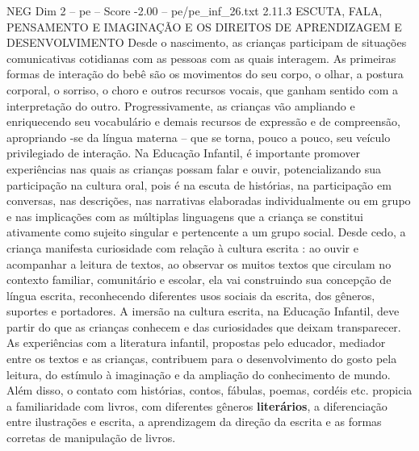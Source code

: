 \begin{textsample}{NEG Dim 2 – pe – Score -2.00 – pe/pe\_inf\_26.txt}  \label{ex:f2_neg_032}
2.11.3 ESCUTA, FALA, PENSAMENTO E IMAGINAÇÃO E OS DIREITOS DE APRENDIZAGEM E DESENVOLVIMENTO Desde o nascimento, as crianças participam de situações comunicativas cotidianas com as pessoas com as quais interagem.
As primeiras formas de interação do bebê são os movimentos do seu corpo, o olhar, a postura corporal, o sorriso, o choro e outros recursos vocais, que ganham sentido com a interpretação do outro.
Progressivamente, as crianças vão ampliando e enriquecendo seu vocabulário e demais recursos de expressão e de compreensão, apropriando -se da língua materna – que se torna, pouco a pouco, seu veículo privilegiado de interação.
Na Educação Infantil, é importante promover experiências nas quais as crianças possam falar e ouvir, potencializando sua participação na cultura oral, pois é na escuta de histórias, na participação em conversas, nas descrições, nas narrativas elaboradas individualmente ou em grupo e nas implicações com as múltiplas linguagens que a criança se constitui ativamente como sujeito singular e pertencente a um grupo social.
Desde cedo, a criança manifesta curiosidade com relação à cultura escrita : ao ouvir e acompanhar a leitura de textos, ao observar os muitos textos que circulam no contexto familiar, comunitário e escolar, ela vai construindo sua concepção de língua escrita, reconhecendo diferentes usos sociais da escrita, dos gêneros, suportes e portadores.
A imersão na cultura escrita, na Educação Infantil, deve partir do que as crianças conhecem e das curiosidades que deixam transparecer.
As experiências com a literatura infantil, propostas pelo educador, mediador entre os textos e as crianças, contribuem para o desenvolvimento do gosto pela leitura, do estímulo à imaginação e da ampliação do conhecimento de mundo.
Além disso, o contato com histórias, contos, fábulas, poemas, cordéis etc. propicia a familiaridade com livros, com diferentes gêneros \textbf{literários}, a diferenciação entre ilustrações e escrita, a aprendizagem da direção da escrita e as formas corretas de manipulação de livros.

\end{textsample}
